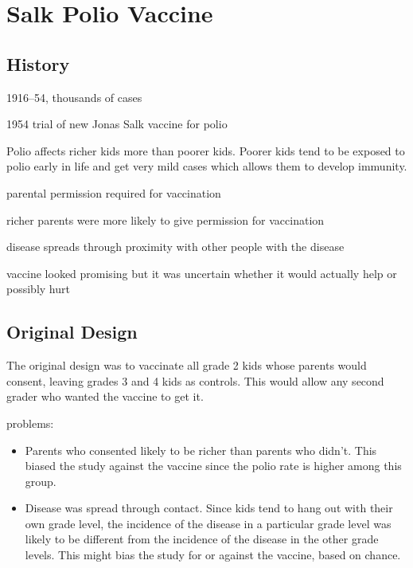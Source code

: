 \documentclass[landscape]{exam}
\begin{document}
  \section{Salk Polio Vaccine}
  \subsection{History}
  \begin{itemize*}
    \item 1916--54, thousands of cases
    \item 1954 trial of new Jonas Salk vaccine for polio
    \item Polio affects richer kids more than poorer kids. Poorer kids tend to
      be exposed to polio early in life and get very mild cases which allows
      them to develop immunity.
    \item parental permission required for vaccination
    \item richer parents were more likely to give permission for vaccination
    \item disease spreads through proximity with other people with the disease
    \item vaccine looked promising but it was uncertain whether it would
      actually help or possibly hurt
  \end{itemize*}

  \subsection{Original Design}
  The original design was to vaccinate all grade 2 kids whose parents would
  consent, leaving grades 3 and 4 kids as controls.  This would allow any second
  grader who wanted the vaccine to get it.

  problems:
  \begin{itemize}

    \item Parents who consented likely to be richer than parents who didn't.
      This biased the study against the vaccine since the polio rate is higher
      among this group.

    \item Disease was spread through contact.  Since kids tend to hang out with
      their own grade level, the incidence of the disease in a particular grade
      level was likely to be different from the incidence of the disease in the
      other grade levels. This might bias the study for or against the vaccine,
      based on chance.
  \end{itemize}
\end{document}
